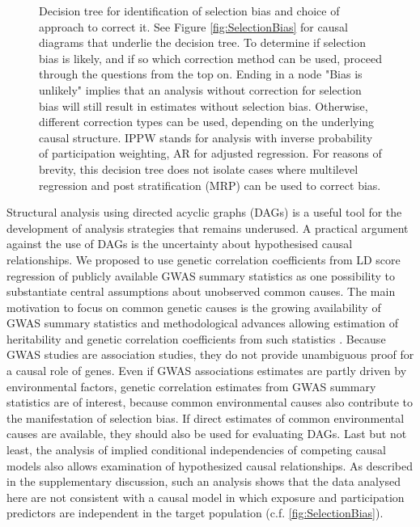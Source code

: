 \documentclass[12pt]{article}
\begin{document}
\begin{figure}
	\centering
	\begin{singlespace}
    \end{singlespace}
	
	\caption{Decision tree for identification of selection bias and choice of approach to correct it. See Figure \ref{fig:SelectionBias} for causal diagrams that underlie the decision tree. 
	To determine if selection bias is likely, and if so which correction method can be used, proceed through the questions from the top on. Ending in a node "Bias is unlikely" implies that an  analysis without correction for selection bias will still result in estimates without selection bias. Otherwise, different correction types can be used, depending on the underlying causal structure. IPPW stands for analysis with inverse probability of participation weighting, AR for adjusted regression. For reasons of brevity, this decision tree does not isolate cases where multilevel regression and post stratification (MRP) can be used to correct bias.}
	\label{fig:DecisionTree}
\end{figure}


Structural analysis using directed acyclic graphs (DAGs) is a useful tool for the development of analysis strategies that remains underused. A practical argument against the use of DAGs is the uncertainty about hypothesised causal relationships. We proposed to use genetic correlation coefficients from LD score regression of publicly available GWAS summary statistics as one possibility to substantiate central assumptions about unobserved common causes. The main motivation to focus on common genetic causes is the growing availability of GWAS summary statistics and methodological advances allowing estimation of heritability and genetic correlation coefficients from such statistics \cite{Bulik-Sullivan2015-er, Bulik-Sullivan2015-xn}. Because GWAS studies are association studies, they do not provide unambiguous proof for a causal role of genes. Even if GWAS associations estimates are partly driven by environmental factors, genetic correlation estimates from GWAS summary statistics are of interest, because common environmental causes also contribute to the manifestation of selection bias. If direct estimates of common environmental causes are available, they should also be used for evaluating DAGs. Last but not least, the analysis of implied conditional independencies of competing causal models also allows examination of hypothesized causal relationships. As described in the supplementary discussion, such an analysis shows that the data analysed here are not consistent with a causal model in which exposure and participation predictors are independent in the target population (c.f. \ref{fig:SelectionBias}).
\end{document}
